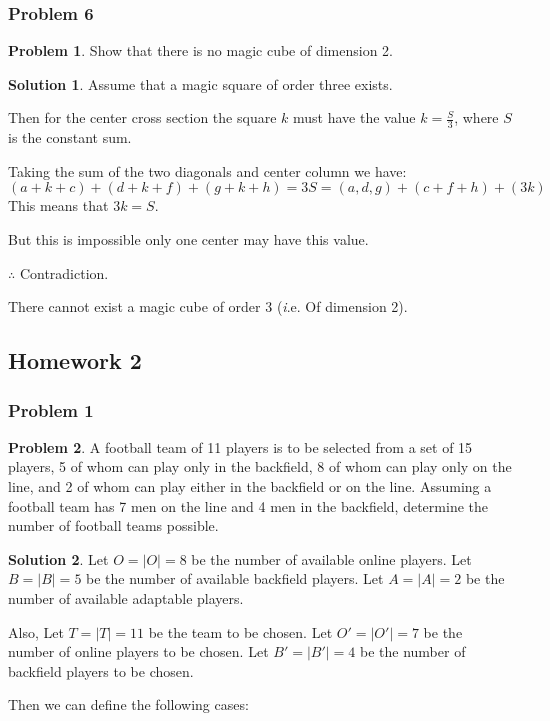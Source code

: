 \documentclass[10pt,a4paper,titlepage,twoside,draft]{article}
\theoremstyle{plain}
\theoremstyle{definition}
\newtheorem*{prob}{Problem}
\newtheorem*{sol}{Solution}
\theoremstyle{remark}
\begin{document}
\subsubsection{Problem 6}

\begin{prob}
    Show that there is no magic cube of dimension 2.
\end{prob}

\medskip

\begin{sol}
    Assume that a magic square of order three exists. 

Then for the center cross section the square $k$ must have the value $k = \frac{S}{3}$, where $S$ is the constant sum. 


Taking the sum of the two diagonals and center column we have: \[(a+k+c)+(d+k+f)+(g+k+h) = 3S = (a,d,g)+(c+f+h)+(3k) \]
This means that $3k = S$. 

But this is impossible only one center may have this value. 

$\therefore$ Contradiction. 

There cannot exist a magic cube of order 3 (\textit i.e. Of dimension 2).
\end{sol}

\pagebreak


\subsection{Homework 2}


\subsubsection{Problem 1}

\begin{prob}
A football team of 11 players is to be selected from a set of 15 players, 5 of whom can play only in the backfield, 8 of whom can play only on the line, and 2 of whom can play either in the backfield or on the line. Assuming a football team has 7 men on the line and 4 men in the backfield, determine the number of football teams possible.
\end{prob}

\medskip

\begin{sol}
Let ${O} = |O| = 8$ be the number of available online players. 
Let ${B} = |B| = 5$ be the number of available backfield players. 
Let ${A} = |A| = 2$ be the number of available adaptable players. 

Also, 
Let ${T} = |T| = 11$ be the team to be chosen. 
Let ${O'} = |O'| = 7$ be the number of online players to be chosen. 
Let ${B'} = |B'| = 4$ be the number of backfield players to be chosen. 

Then we can define the following cases: 
\end{sol}
\end{document}

